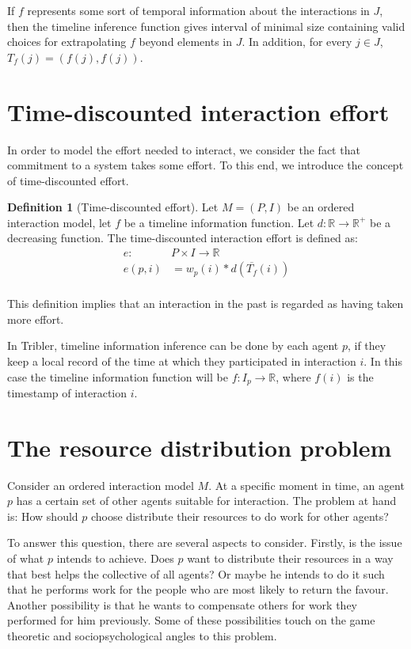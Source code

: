 \documentclass[a4paper,11pt]{book}
\newcommand{\bb}{\mathbb}
\newcommand{\ov}{\overline}
\theoremstyle{definition}
\newtheorem{definition}{Definition}
\begin{document}
If $f$ represents some sort of temporal information about the interactions in $J$, 
then the timeline inference function gives interval of minimal size containing valid choices for extrapolating
$f$ beyond elements in $J$. In addition, for every $j \in J$, $T_f(j) = (f(j), f(j))$.

\section{Time-discounted interaction effort}

In order to model the effort needed to interact, we consider the fact that commitment to
a system takes some effort. To this end, we introduce the concept of time-discounted effort.

\begin{definition}[Time-discounted effort]
    Let $M = (P, I)$ be an ordered interaction model, let $f$ be a timeline information function.
    Let $d: \bb{R} \to \bb{R}^+$ be a decreasing function. The time-discounted interaction
    effort is defined as:
    \begin{align*}
        e: & P \times I \to \bb{R} \\
        e(p, i) &= w_p(i)*d(\ov{T_f}(i)) \\
    \end{align*}
\end{definition}

This definition implies that an interaction in the past is regarded as having taken more effort.


In Tribler, timeline information inference can be done by each agent $p$, if they
keep a local record of the time at which they participated in interaction $i$. In this
case the timeline information function will be $f : I_p \to \bb{R}$, where $f(i)$ is
the timestamp of interaction $i$.



\section{The resource distribution problem}

Consider an ordered interaction model $M$. At a specific moment in time, an agent
$p$ has a certain set of other agents suitable for interaction. The problem
at hand is: How should $p$ choose distribute their resources to do work for other agents?


To answer this question, there are several aspects to consider. Firstly, is the issue of
what $p$ intends to achieve. Does $p$ want to distribute their resources in a way that
best helps the collective of all agents? Or maybe he intends to do it such that
he performs work for the people who are most likely to return the favour. Another possibility
is that he wants to compensate others for work they performed for him previously.
Some of these possibilities touch on the game theoretic and sociopsychological angles to this problem.
\end{document}
